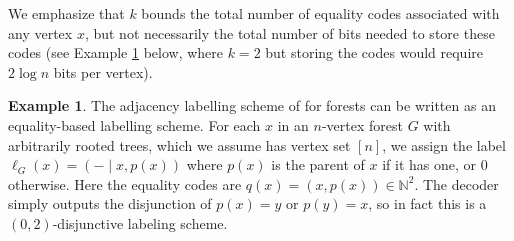 \documentclass[11pt]{article}
\theoremstyle{definition}
\newtheorem{example}[thm]{Example}
\def\bN{{\mathbb N}}
\begin{document}
We emphasize that $k$ bounds the total number of equality codes associated with any vertex $x$, but
not necessarily the total number of bits needed to store these codes (see Example
\ref{example:disjunctive} below, where $k=2$ but storing the codes would require $2\log n$ bits per
vertex). 

\begin{example}
\label{example:disjunctive}
The adjacency labelling scheme of \cite{KNR92} for forests can be written as an equality-based
labelling scheme. For each $x$ in an $n$-vertex forest $G$ with arbitrarily rooted trees, which we
assume has vertex set $[n]$, we assign the label $\ell_G(x) = ( - \mid x,p(x) )$ where $p(x)$ is the
parent of $x$ if it has one, or 0 otherwise. Here the equality codes are $q(x) = (x,p(x)) \in
\bN^2$. The decoder simply outputs the disjunction of $p(x) = y$ or $p(y) = x$, so in fact this is a
$(0,2)$-disjunctive labeling scheme.
\end{example}
\end{document}
